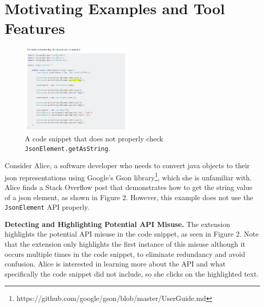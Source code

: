 \section{Motivating Examples and Tool Features}
\label{sec:motivation}
\begin{figure}
\includegraphics[width=0.48\textwidth]{json_ex1.PNG}
\vspace{.1in}
\caption{A code snippet that does not properly check {\tt JsonElement.getAsString}.\protect\footnotemark{}}
\label{fig:so_example}
\end{figure}


Consider Alice, a software developer who needs to convert java objects to their json representations using Google's Gson library\footnote{https://github.com/google/gson/blob/master/UserGuide.md}, which she is unfamiliar with. Alice finds a Stack Overflow post that demonstrates how to get the string value of a json element, as shown in Figure 2. However, this example does not use the {\tt JsonElement} API properly. 

{\bf Detecting and Highlighting Potential API Misuse.}
The extension highlights the potential API misuse in the code snippet, as seen in Figure 2. Note that the extension only highlights the first instance of this misuse although it occurs multiple times in the code snippet, to eliminate redundancy and avoid confusion. Alice is interested in learning more about the API and what specifically the code snippet did not include, so she clicks on the highlighted text.

